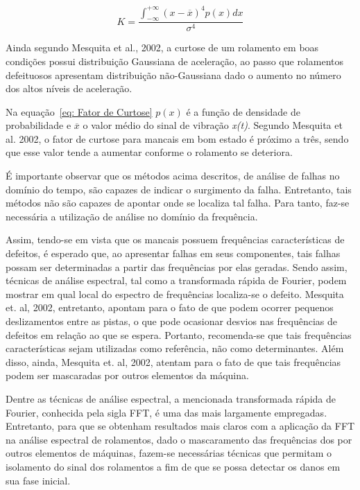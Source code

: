 \documentclass[
	12pt,				
	oneside,			
	a4paper,			
	english,			
	brazil,			
	]{abntex2ppgsi}
\begin{document}
\begin{equation}
	K = \frac{ \int_{-\infty}^{+\infty} (x - \overline{x})^{4}p(x)dx } {\sigma^{4}}
	\label{eq: Fator de Curtose}
\end{equation}

Ainda segundo Mesquita et al., 2002, a curtose de um rolamento em boas condições possui distribuição Gaussiana de aceleração, ao passo que rolamentos defeituosos apresentam distribuição não-Gaussiana dado o aumento no número dos altos níveis de aceleração. 

Na equação~\ref{eq: Fator de Curtose} $p(x)$ é a função de densidade de probabilidade e $\overline{x}$ o valor médio do sinal de vibração \textit{x(t)}. Segundo Mesquita et al. 2002, o fator de curtose para mancais em bom estado é próximo a três, sendo que esse valor tende a aumentar conforme o rolamento se deteriora. 

É importante observar que os métodos acima descritos, de análise de falhas no domínio do tempo, são capazes de indicar o surgimento da falha. Entretanto, tais métodos não são capazes de apontar onde se localiza tal falha. Para tanto, faz-se necessária a utilização de análise no domínio da frequência. 

Assim, tendo-se em vista que os mancais possuem frequências características de defeitos, é esperado que, ao apresentar falhas em seus componentes, tais falhas possam ser determinadas a partir das frequências por elas geradas. Sendo assim, técnicas de análise espectral, tal como a transformada rápida de Fourier, podem mostrar em qual local do espectro de frequências localiza-se o defeito. Mesquita et. al, 2002, entretanto, apontam para o fato de que podem ocorrer pequenos deslizamentos entre as pistas, o que pode ocasionar desvios nas frequências de defeitos em relação ao que se espera. Portanto, recomenda-se que tais frequências características sejam utilizadas como referência, não como determinantes. Além disso, ainda, Mesquita et. al, 2002, atentam para o fato de que tais frequências podem ser mascaradas por outros elementos da máquina.

Dentre as técnicas de análise espectral, a mencionada transformada rápida de Fourier, conhecida pela sigla FFT, é uma das mais largamente empregadas. Entretanto, para que se obtenham resultados mais claros com a aplicação da FFT na análise espectral de rolamentos, dado o mascaramento das frequências dos por outros elementos de máquinas, fazem-se necessárias técnicas que permitam o isolamento do sinal dos rolamentos a fim de que se possa detectar os danos em sua fase inicial. 
\end{document}
